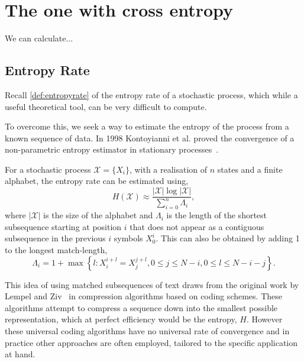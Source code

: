 \chapter{The one with cross entropy \label{ch:crossentropy}}

We can calculate...

\section{Entropy Rate}

Recall \autoref{def:entropyrate} of the entropy rate of a stochastic process, which while a useful theoretical tool, can be very difficult to compute. 

To overcome this, we seek a way to estimate the entropy of the process from a known sequence of data. In 1998 Kontoyianni et al. proved the convergence of a non-parametric entropy estimator in stationary processes~\cite{kontoyiannisNonparametricEntropyEstimation1998}.

\begin{definition} \label{def:kontoyianni}
	For a stochastic process $\mathcal{X} = \{X_i\}$, with a realisation of $n$ states and a finite alphabet,  the entropy rate can be estimated using,
		\begin{equation}\label{eq:estimate}
	H(\mathcal{X}) \approx\frac{|\mathcal{X}| \log |\mathcal{X}| }{\sum_{i=0}^n \Lambda_{i} },
	\end{equation}
	where $|\mathcal{X}|$ is the size of the alphabet and $\Lambda_{i}$ is the length of the shortest subsequence starting at position $i$ that does not appear as a contiguous subsequence in the previous $i$ symbols $X_{0}^{i}$. This can also be obtained by adding 1 to the longest match-length, 
	 \begin{equation}\label{eq:lambda}
	  \Lambda_{i}=1+\max \left\{l: X_{i}^{i+l}=X_{j}^{j+l}, 0 \leq j \leq N-i, 0 \leq l \leq N - i - j \right\}.
	 \end{equation}
\end{definition}


This idea of using matched subsequences of text draws from the original work by Lempel and Ziv~\cite{zivUniversalAlgorithmSequential1977} in compression algorithms based on coding schemes. These algorithms attempt to compress a sequence down into the smallest possible representation, which at perfect efficiency would be the entropy, $H$. However these universal coding algorithms have no universal rate of convergence \cite{shieldsUniversalRedundancyRates1993, shieldsUniversalRedundancyRates1995} and in practice other approaches are often employed, tailored to the specific application at hand.

